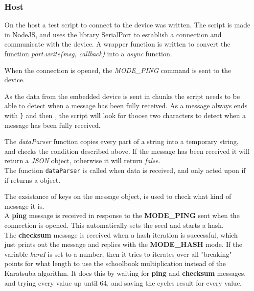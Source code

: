 \subsubsection{Host}
On the host a test script to connect to the device was written. The script is made in NodeJS\cite{nodejs}, and uses the library SerialPort\cite{serialport} to establish a connection and communicate with the device.
A wrapper function is written to convert the function \textit{port.write(msg, callback)} into a \textit{async} function. 

\medskip
When the connection is opened, the \textit{MODE\_PING} command is sent to the device.

\medskip
As the data from the embedded device is sent in chunks the script needs to be able to detect when a message has been fully received. As a message always ends with \texttt{\}} and then \textit{,} the script will look for thoose two characters to detect when a message has been fully received.

The \textit{dataParser} function copies every part of a string into a temporary string, and checks the condition described above. If the message has been received it will return a \textit{JSON} object, otherwise it will return \textit{false}.\medskip
\\
The function \texttt{dataParser} is called when data is received, and only acted upon if if returns a object.  

\medskip
The exsistance of keys on the message object, is used to check what kind of message it is.\\
\medskip
A \textbf{ping} message is received in response to the \textbf{MODE\_PING} sent when the connection is opened. This automatically sets the seed and starts a hash.\\
\medskip
The \textbf{checksum} message is received when a hash iteration is successful, which just prints out the message and replies with the \textbf{MODE\_HASH} mode.
\label{karatTesting}
If the variable \textit{karaI} is set to a number, then it tries to iterates over all "breaking" points for what length to use the schoolbook multiplication instead of the Karatsuba algorithm. It does this by waiting for \textbf{ping} and \textbf{checksum} messages, and trying every value up until 64, and saving the cycles result for every value.

